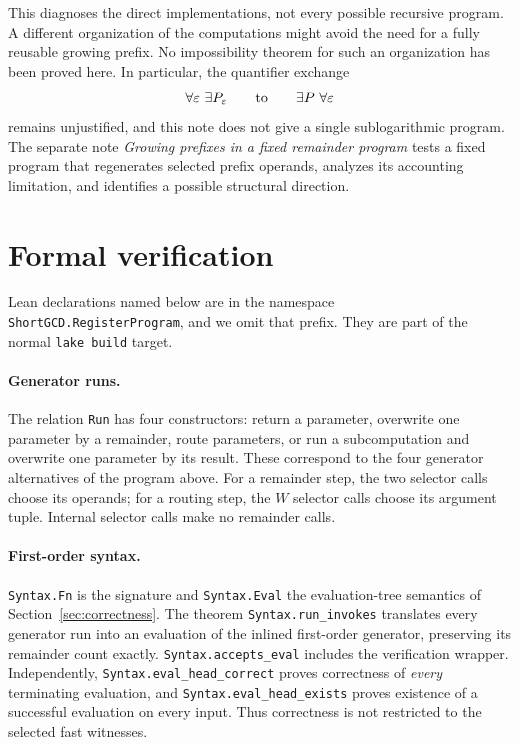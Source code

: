 \documentclass[11pt]{article}
\newcommand{\lean}[1]{\nolinkurl{#1}}
\begin{document}
This diagnoses the direct implementations, not every possible recursive
program. A different organization of the computations might avoid the need
for a fully reusable growing prefix. No impossibility theorem for such an
organization has been proved here. In particular, the quantifier exchange
\[
\forall\varepsilon\ \exists P_\varepsilon
\qquad\hbox{to}\qquad
\exists P\ \forall\varepsilon
\]
remains unjustified, and this note does not give a single sublogarithmic
program. The separate note \emph{Growing prefixes in a fixed remainder
program} \cite{investigation} tests a fixed program that regenerates selected
prefix operands, analyzes its accounting limitation, and identifies a
possible structural direction.

\section{Formal verification}\label{sec:lean}

Lean declarations named below are in the namespace
\lean{ShortGCD.RegisterProgram}, and we omit that prefix. They are part of
the normal \texttt{lake build} target.

\paragraph{Generator runs.}
The relation \lean{Run} has four constructors: return a parameter, overwrite
one parameter by a remainder, route parameters, or run a subcomputation and
overwrite one parameter by its result. These correspond to the four generator
alternatives of the program above. For a remainder step, the two selector
calls choose its operands; for a routing step, the $W$ selector calls choose
its argument tuple. Internal selector calls make no remainder calls.

\paragraph{First-order syntax.}
\lean{Syntax.Fn} is the signature and \lean{Syntax.Eval} the evaluation-tree
semantics of Section~\ref{sec:correctness}.
The theorem \lean{Syntax.run_invokes} translates every generator run into an
evaluation of the inlined first-order generator, preserving its remainder
count exactly. \lean{Syntax.accepts_eval} includes the verification wrapper.
Independently, \lean{Syntax.eval_head_correct} proves correctness of
\emph{every} terminating evaluation, and \lean{Syntax.eval_head_exists}
proves existence of a successful evaluation on every input. Thus correctness
is not restricted to the selected fast witnesses.
\end{document}

